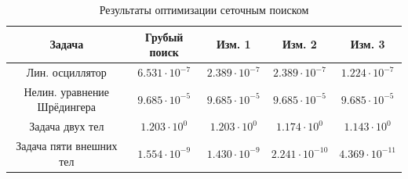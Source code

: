 \begin{table}
	\centering
	\caption{Результаты оптимизации сеточным поиском}
	\label{tab:grid_search_results}
	\vspace{5mm}
	\small
	
	\renewcommand{\arraystretch}{1.5}
	
	\begin{tabular}{|c|c|c|c|c|}
		\hline
		\textbf{Задача} &
		\textbf{Грубый поиск} &
		\textbf{Изм. 1} &
		\textbf{Изм. 2} &
		\textbf{Изм. 3}
		\\ \hline
		
		Лин. осциллятор &
		$6.531 \cdot 10^{-7}$ &
		$2.389 \cdot 10^{-7}$ &
		$2.389 \cdot 10^{-7}$ &
		$1.224 \cdot 10^{-7}$
		\\ \hline
		
		Нелин. уравнение Шрёдингера &
		$9.685\cdot 10^{-5}$ &
		$9.685\cdot 10^{-5}$  &
		$9.685\cdot 10^{-5}$  &
		$9.685\cdot 10^{-5}$ 
		\\ \hline
		
		Задача двух тел &
		$1.203 \cdot 10^{0}$ &
		$1.203 \cdot 10^{0}$ &
		$1.174 \cdot 10^{0}$ &
		$1.143 \cdot 10^{0}$
		\\ \hline
		
		Задача пяти внешних тел &
		$1.554 \cdot 10^{-9}$ &
		$1.430 \cdot 10^{-9}$ &
		$2.241 \cdot 10^{-10}$ &
		$4.369 \cdot 10^{-11}$
		\\ \hline
		
	\end{tabular}
	
	\renewcommand{\arraystretch}{1}
\end{table}